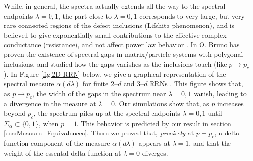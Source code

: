 \documentclass[english,12pt,jmp,graphicx]{revtex4-1}
\begin{document}
While, in general, the spectra actually extends all the way
to the spectral endpoints $\lambda=0,1$, the part close to $\lambda=0,1$
corresponds to very large, but very rare connected regions of the
defect inclusions (Lifshitz phenomenon), and is
believed to give exponentially small contributions to the effective
complex conductance (resistance), and not
affect power law behavior \cite{Golden:PRL-3935}. In
\cite{Bruno:PRSLA-353} O. Bruno has proven the existence of spectral
gaps in matrix/particle systems with polygonal inclusions, and studied
how the gaps vanishes as the inclusions touch (like $p\to p_c$). In
Figure \ref{fig:2D-RRN} below, we give a graphical representation of the
spectral measure $\alpha(d\lambda)$ for finite 2--$d$ and 3--$d$ RRNs
\cite{Golden:JoB:337}. This figure shows that, as $p\to p_c$, the width
of the gaps in the spectrum near $\lambda=0,1$ vanish, leading to a
divergence in the measure at $\lambda=0$. Our simulations show that, as $p$
increases beyond $p_c$, the spectrum piles up at the spectral
endpoints $\lambda=0,1$ until $\Sigma_\alpha\subset\{0,1\}$, when $p=1$. This behavior is
predicted by our result in section
\ref{sec:Measure_Equivalences}. There we proved that, \emph{precisely}
at $p=p_c$, a delta function component of the measure $\alpha(d\lambda)$ appears 
at $\lambda=1$, and that the weight of the essental delta function at $\lambda=0$
diverges.
\end{document}
